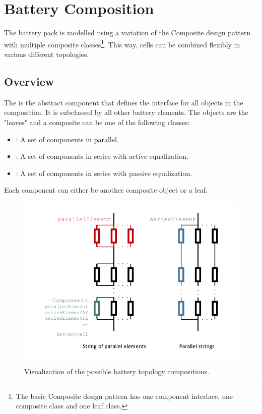 \section{Battery Composition}
The battery pack is modelled using a variation of the Composite design pattern with multiple composite classes\footnote{The basic Composite design pattern has one component interface, one composite class and one leaf class.}. This way, cells can be combined flexibly in various different topologies.

\subsection{Overview}
\label{sec:batteryCompositionOverview}
The  is the abstract component that defines the interface for all objects in the composition. It is subclassed by all other battery elements. The  objects are the "leaves" and a composite can be one of the following classes:
\begin{itemize}
	\item {}: A set of components in parallel.
	\item {}: A set of components in series with active equalization.
	\item {}: A set of components in series with passive equalization.
\end{itemize}
Each component can either be another composite object or a leaf.
\begin{figure}[b!]
	\captionsetup{type=figure}
	\centering
	\includegraphics[width=\textwidth]{topologies2.pdf}
	\caption[Visualization of the possible battery topology compositions]{Visualization of the possible battery topology compositions.}
	\label{fig:topologies2}
\end{figure}
